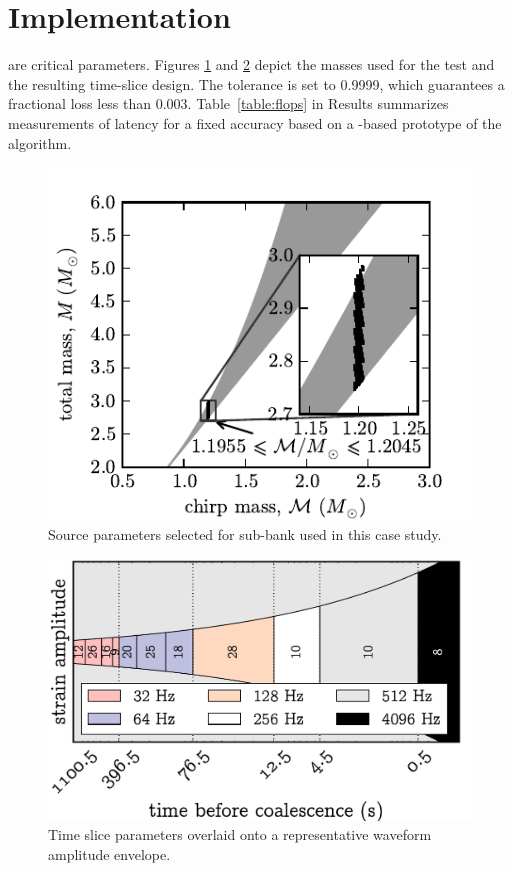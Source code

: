 \documentclass[portrait,plainboxedsections]{sciposter}
\begin{document}
\begin{minipage}[t]{0.25\textwidth}

\section*{Implementation}

 are critical parameters. Figures
\ref{fig:tmpltbank} and \ref{fig:time_slices}
depict the masses used for the test and the resulting time-slice design. The
\SVD{} tolerance is set to 0.9999, which guarantees a fractional \SNR{} loss
less than 0.003. Table~\ref{table:flops} in Results summarizes measurements of
latency for a fixed accuracy based on a \gstreamer{}-based prototype of the
\lloid{} algorithm.

\begin{figure}[h]
	\includegraphics[width=\textwidth]{figures/tmpltbank}
	\caption{\label{fig:tmpltbank}Source parameters selected for sub-bank used in this
case study.}
\end{figure}

\begin{figure}
\includegraphics[width=\textwidth]{figures/envelope}
\caption{\label{fig:time_slices} Time slice parameters overlaid onto a representative waveform amplitude envelope.}
\end{figure}


\end{minipage}
\end{document}
